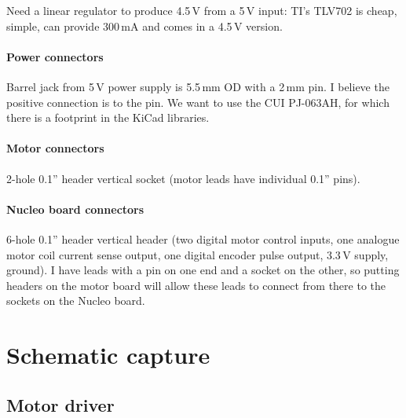 \documentclass[a4paper,11pt,article]{memoir}
\begin{document}
Need a linear regulator to produce 4.5\,V from a 5\,V input: TI's
TLV702 is cheap, simple, can provide 300\,mA and comes in a 4.5\,V
version.

\paragraph{Power connectors}

Barrel jack from 5\,V power supply is 5.5\,mm OD with a 2\,mm pin. I
believe the positive connection is to the pin. We want to use the CUI
PJ-063AH, for which there is a footprint in the KiCad libraries.

\paragraph{Motor connectors}

2-hole 0.1'' header vertical socket (motor leads have individual 0.1''
pins).

\paragraph{Nucleo board connectors}

6-hole 0.1'' header vertical header (two digital motor control inputs,
one analogue motor coil current sense output, one digital encoder
pulse output, 3.3\,V supply, ground). I have leads with a pin on one
end and a socket on the other, so putting headers on the motor board
will allow these leads to connect from there to the sockets on the
Nucleo board.


\section*{Schematic capture}

\subsection*{Motor driver}
\end{document}
